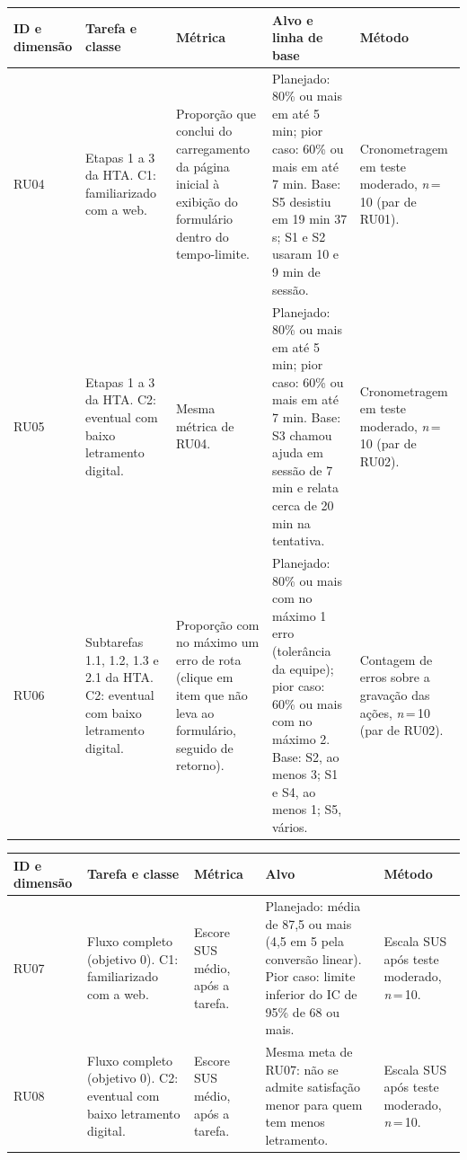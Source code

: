 \documentclass[
  12pt,
  oneside,
  a4paper,
  chapter=TITLE,
  section=TITLE,
  english,
  brazilian
]{abntex2}
\renewcommand{\fonte}[1]{\par\vspace{3pt}{\footnotesize\raggedright\noindent Fonte: #1\par}\vspace{4pt}}%
\newcommand{\rudim}{}
\newcommand{\rulinha}[5]{%
  #1\newline\rudim & #2 & #3 & #4 & #5 \\\hline}
\begin{document}
\begin{quadro}[!htb]
  \caption{Requisitos de eficiência (RU04 a RU06)}\label{qua:ru-eficiencia}
  \centering\footnotesize\renewcommand{\rudim}{Eficiência}
  \begin{tabularx}{\textwidth}{|P{1.7cm}|Y|Y|Y|Y|}\hline
    ID e dimensão & Tarefa e classe & Métrica & Alvo e linha de base & Método \\\hline
    \rulinha{RU04}{Etapas 1 a 3 da HTA. C1: familiarizado com a web.}{Proporção que conclui do carregamento da página inicial à exibição do formulário dentro do tempo-limite.}{Planejado: 80\% ou mais em até 5 min; pior caso: 60\% ou mais em até 7 min. Base: S5 desistiu em 19 min 37 s; S1 e S2 usaram 10 e 9 min de sessão.}{Cronometragem em teste moderado, \textit{n}\,=\,10 (par de RU01).}
    \rulinha{RU05}{Etapas 1 a 3 da HTA. C2: eventual com baixo letramento digital.}{Mesma métrica de RU04.}{Planejado: 80\% ou mais em até 5 min; pior caso: 60\% ou mais em até 7 min. Base: S3 chamou ajuda em sessão de 7 min e relata cerca de 20 min na tentativa.}{Cronometragem em teste moderado, \textit{n}\,=\,10 (par de RU02).}
    \rulinha{RU06}{Subtarefas 1.1, 1.2, 1.3 e 2.1 da HTA. C2: eventual com baixo letramento digital.}{Proporção com no máximo um erro de rota (clique em item que não leva ao formulário, seguido de retorno).}{Planejado: 80\% ou mais com no máximo 1 erro (tolerância da equipe); pior caso: 60\% ou mais com no máximo 2. Base: S2, ao menos 3; S1 e S4, ao menos 1; S5, vários.}{Contagem de erros sobre a gravação das ações, \textit{n}\,=\,10 (par de RU02).}
  \end{tabularx}
  \fonte{Elaborado pelos autores (2026).}
\end{quadro}\FloatBarrier

\begin{quadro}[!htb]
  \caption{Requisitos de satisfação (RU07 e RU08)}\label{qua:ru-satisfacao}
  \centering\footnotesize\renewcommand{\rudim}{Satisfação}
  \begin{tabularx}{\textwidth}{|P{1.7cm}|Y|Y|Y|Y|}\hline
    ID e dimensão & Tarefa e classe & Métrica & Alvo & Método \\\hline
    \rulinha{RU07}{Fluxo completo (objetivo 0). C1: familiarizado com a web.}{Escore SUS médio, após a tarefa.}{Planejado: média de 87,5 ou mais (4,5 em 5 pela conversão linear). Pior caso: limite inferior do IC de 95\% de 68 ou mais.}{Escala SUS após teste moderado, \textit{n}\,=\,10.}
    \rulinha{RU08}{Fluxo completo (objetivo 0). C2: eventual com baixo letramento digital.}{Escore SUS médio, após a tarefa.}{Mesma meta de RU07: não se admite satisfação menor para quem tem menos letramento.}{Escala SUS após teste moderado, \textit{n}\,=\,10.}
  \end{tabularx}
  \fonte{Elaborado pelos autores (2026).}
\end{quadro}\FloatBarrier
\end{document}
